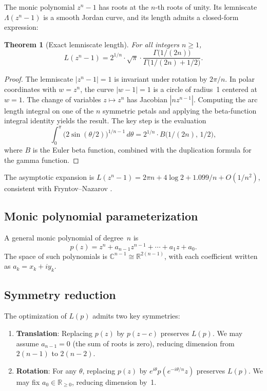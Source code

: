 \documentclass[11pt]{article}
\theoremstyle{plain}
\newtheorem{theorem}{Theorem}
\theoremstyle{definition}
\theoremstyle{remark}
\begin{document}
The monic polynomial $z^n - 1$ has roots at the $n$-th roots of unity. Its lemniscate $\Lambda(z^n - 1)$ is a smooth Jordan curve, and its length admits a closed-form expression:

\begin{theorem}[Exact lemniscate length]
\label{thm:exact}
For all integers $n \geq 1$,
\[
L(z^n - 1) = 2^{1/n} \cdot \sqrt{\pi} \cdot \frac{\Gamma\bigl(1/(2n)\bigr)}{\Gamma\bigl(1/(2n) + 1/2\bigr)}.
\]
\end{theorem}

\begin{proof}
The lemniscate $|z^n - 1| = 1$ is invariant under rotation by $2\pi/n$. In polar coordinates with $w = z^n$, the curve $|w - 1| = 1$ is a circle of radius~1 centered at $w = 1$. The change of variables $z \mapsto z^n$ has Jacobian $|nz^{n-1}|$. Computing the arc length integral on one of the $n$ symmetric petals and applying the beta-function integral identity yields the result. The key step is the evaluation
\[
\int_0^{\pi} \bigl(2\sin(\theta/2)\bigr)^{1/n - 1} \, d\theta = 2^{1/n} \cdot B\bigl(1/(2n),\, 1/2\bigr),
\]
where $B$ is the Euler beta function, combined with the duplication formula for the gamma function.
\end{proof}

The asymptotic expansion is $L(z^n - 1) = 2\pi n + 4\log 2 + 1.099/n + O(1/n^2)$, consistent with Fryntov--Nazarov \cite{FN2025}.

\subsection{Monic polynomial parameterization}

A general monic polynomial of degree~$n$ is
\[
p(z) = z^n + a_{n-1}z^{n-1} + \cdots + a_1 z + a_0.
\]
The space of such polynomials is $\mathbb{C}^{n-1} \cong \mathbb{R}^{2(n-1)}$, with each coefficient written as $a_k = x_k + iy_k$.

\subsection{Symmetry reduction}
\label{sec:symmetry}

The optimization of $L(p)$ admits two key symmetries:

\begin{enumerate}[nosep]
\item \textbf{Translation}: Replacing $p(z)$ by $p(z - c)$ preserves $L(p)$. We may assume $a_{n-1} = 0$ (the sum of roots is zero), reducing dimension from $2(n-1)$ to $2(n-2)$.
\item \textbf{Rotation}: For any $\theta$, replacing $p(z)$ by $e^{i\theta}p(e^{-i\theta/n}z)$ preserves $L(p)$. We may fix $a_0 \in \mathbb{R}_{\geq 0}$, reducing dimension by~1.
\end{enumerate}
\end{document}
